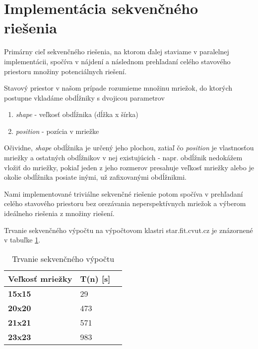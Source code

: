 \documentclass[slovak]{article}
\begin{document}
\section{Implementácia sekvenčného riešenia}

Primárny cieľ sekvenčného riešenia, na ktorom ďalej staviame v paralelnej implementácii, spočíva v nájdení a následnom prehľadaní celého stavového priestoru množiny potenciálnych riešení. 

Stavový priestor v našom prípade rozumieme množinu mriežok, do ktorých postupne vkladáme obdĺžniky s dvojicou parametrov

\begin{enumerate}

\item \emph{shape} - veľkosť obdĺžnika (dĺžka x šírka)

\item \emph{position} - pozícia v mriežke

\end{enumerate}

Očividne, \emph{shape} obdĺžnika je určený jeho plochou, zatiaľ čo \emph{position} je vlastnosťou mriežky a ostatných obdĺžnikov v nej existujúcich - napr. obdĺžnik nedokážem vložiť do mriežky, pokiaľ jeden z jeho rozmerov presahuje veľkosť mriežky alebo je okolie obdĺžnika posiate inými, už zafixovanými obdĺžnikmi.

Nami implementované triviálne sekvenčné riešenie potom spočíva v prehľadaní celého stavového priestoru bez orezávania neperspektívnych mriežok a výberom ideálneho riešenia z množiny riešení.

Trvanie sekvenčného výpočtu na výpočtovom klastri star.fit.cvut.cz je znázornené v tabuľke \ref{tab:sek}.

	\begin{table}\centering
		\begin{tabularx}{\textwidth}{|X|X|X|}
			\hline                        
			\textbf{Veľkosť mriežky} & \textbf{T(n) [s]} \\ \hline
			\textbf{15x15} 	& 29 \\ \hline
			\textbf{20x20} 	& 473 \\ \hline
			\textbf{21x21} 	& 571 \\ \hline
			\textbf{23x23} 	& 983 \\ \hline
		\end{tabularx}
	\caption{Trvanie sekvenčného výpočtu}
	\label{tab:sek}
	\end{table}
\end{document}
